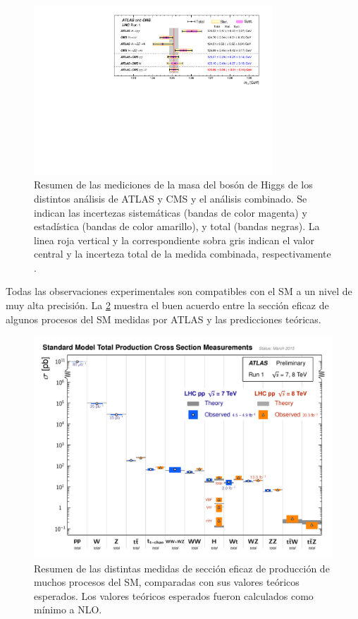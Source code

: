 \begin{figure}[!htbp]
  \centering \includegraphics[width=0.8\textwidth]{figures/higgs_atlas_cms_mass}
  \caption{Resumen de las mediciones de la masa del bosón de Higgs de los
    distintos análisis de ATLAS y CMS y el análisis combinado. Se indican las
    incertezas sistemáticas (bandas de color magenta) y estadística (bandas de
    color amarillo), y total (bandas negras). La linea roja vertical y la
    correspondiente sobra gris indican el valor central y la incerteza total de
    la medida combinada, respectivamente \cite{HiggsMass_ATLAS_CMS}.}
  \label{fig:higgs_cms_atlas}
\end{figure}

Todas las observaciones experimentales son compatibles con el SM a un nivel de
muy alta precisión. La \cref{fig:sm_atlas_xs} muestra el buen acuerdo entre la
sección eficaz de algunos procesos del SM medidas por ATLAS y las predicciones
teóricas.

\begin{figure}[!htbp]
  \centering
  \includegraphics[width=1\textwidth]{figures/ATLAS_a_SMSummary_TotalXsect.pdf}
  \caption{Resumen de las distintas medidas de sección eficaz de producción de muchos
    procesos del SM, comparadas con sus valores teóricos esperados.
    Los valores teóricos esperados fueron calculados como mínimo a NLO\cite{ATLASSM}.}
  \label{fig:sm_atlas_xs}
\end{figure}


